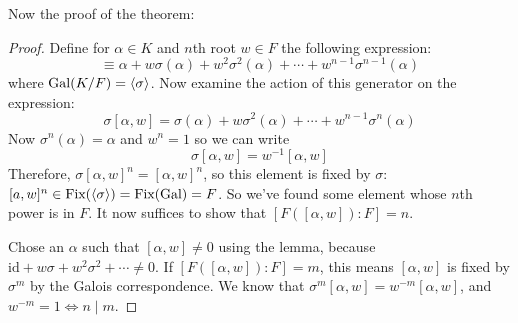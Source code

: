 \documentclass[a4paper,twoside,master.tex]{subfiles}
\begin{document}
Now the proof of the theorem:
\begin{proof}
    Define for $ \alpha \in K $ and $ n $th root $ w \in F $ the following expression:
    \begin{equation}
        [\alpha, w] \equiv \alpha + w \sigma(\alpha) + w^2 \sigma^2(\alpha) + \cdots + w^{n-1} \sigma^{n-1}(\alpha)
    \end{equation}
    where $ \text{Gal}(K/F) = \ev{\sigma} $. Now examine the action of this generator on the expression:
    \begin{equation}
        \sigma [\alpha, w] = \sigma(\alpha) + w \sigma^2(\alpha) + \cdots + w^{n-1} \sigma^n(\alpha)
    \end{equation}
    Now $ \sigma^n(\alpha) = \alpha $ and $ w^n = 1 $ so we can write
    \begin{equation}
        \sigma [\alpha, w] = w^{-1} [\alpha, w]
    \end{equation}
    Therefore, $ \sigma [\alpha, w]^n = [\alpha, w]^n $, so this element is fixed by $\sigma$: $ [a, w]^n \in \text{Fix}(\ev{\sigma}) = \text{Fix}(\text{Gal}) = F $. So we've found some element whose $ n $th power is in $ F $. It now suffices to show that $ [F([\alpha, w])\colon F] = n $.

    Chose an $ \alpha $ such that $ [\alpha, w] \neq 0 $ using the lemma, because $ \text{id} + w \sigma + w^2 \sigma^2 + \cdots \neq 0 $. If $ [F([\alpha, w])\colon F] = m $, this means $ [\alpha, w] $ is fixed by $ \sigma^m $ by the Galois correspondence. We know that $ \sigma^m [\alpha, w] = w^{-m} [\alpha, w] $, and $ w^{-m} = 1 \iff n\mid m $. 
\end{proof}
\end{document}
